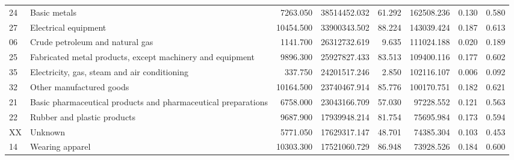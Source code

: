 \begin{tabular}{llrrrrrr}
          24 &                                                                                                 Basic metals &        7263.050 &     38514452.032 &      61.292 &           162508.236 &        0.130 &                 0.580 \\
          27 &                                                                                         Electrical equipment &       10454.500 &     33900343.502 &      88.224 &           143039.424 &        0.187 &                 0.613 \\
          06 &                                                                              Crude petroleum and natural gas &        1141.700 &     26312732.619 &       9.635 &           111024.188 &        0.020 &                 0.189 \\
          25 &                                                    Fabricated metal products, except machinery and equipment &        9896.300 &     25927827.433 &      83.513 &           109400.116 &        0.177 &                 0.602 \\
          35 &                                                                 Electricity, gas, steam and air conditioning &         337.750 &     24201517.246 &       2.850 &           102116.107 &        0.006 &                 0.092 \\
          32 &                                                                                     Other manufactured goods &       10164.500 &     23740467.914 &      85.776 &           100170.751 &        0.182 &                 0.621 \\
          21 &                                                Basic pharmaceutical products and pharmaceutical preparations &        6758.000 &     23043166.709 &      57.030 &            97228.552 &        0.121 &                 0.563 \\
          22 &                                                                                  Rubber and plastic products &        9687.900 &     17939948.214 &      81.754 &            75695.984 &        0.173 &                 0.594 \\
          XX &                                                                                                      Unknown &        5771.050 &     17629317.147 &      48.701 &            74385.304 &        0.103 &                 0.453 \\
          14 &                                                                                              Wearing apparel &       10303.300 &     17521060.729 &      86.948 &            73928.526 &        0.184 &                 0.600 \\

\end{tabular}
